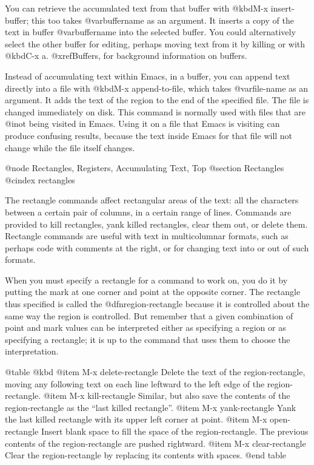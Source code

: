 {{{{{{{{  You can retrieve the accumulated text from that buffer with @kbd{M-x
insert-buffer}; this too takes @var{buffername} as an argument.  It inserts
a copy of the text in buffer @var{buffername} into the selected buffer.
You could alternatively select the other buffer for editing, perhaps moving
text from it by killing or with @kbd{C-x a}.  @xref{Buffers}, for
background information on buffers.

  Instead of accumulating text within Emacs, in a buffer, you can append
text directly into a file with @kbd{M-x append-to-file}, which takes
@var{file-name} as an argument.  It adds the text of the region to the end
of the specified file.  The file is changed immediately on disk. This
command is normally used with files that are @i{not} being visited in
Emacs.  Using it on a file that Emacs is visiting can produce confusing
results, because the text inside Emacs for that file will not change
while the file itself changes.

@node Rectangles, Registers, Accumulating Text, Top
@section Rectangles
@cindex rectangles

  The rectangle commands affect rectangular areas of the text: all the
characters between a certain pair of columns, in a certain range of lines.
Commands are provided to kill rectangles, yank killed rectangles, clear
them out, or delete them.  Rectangle commands are useful with text in
multicolumnar formats, such as perhaps code with comments at the right,
or for changing text into or out of such formats.

  When you must specify a rectangle for a command to work on, you do
it by putting the mark at one corner and point at the opposite corner.
The rectangle thus specified is called the @dfn{region-rectangle}
because it is controlled about the same way the region is controlled.
But remember that a given combination of point and mark values can be
interpreted either as specifying a region or as specifying a
rectangle; it is up to the command that uses them to choose the
interpretation.

@table @kbd
@item M-x delete-rectangle
Delete the text of the region-rectangle, moving any following text on
each line leftward to the left edge of the region-rectangle.
@item M-x kill-rectangle
Similar, but also save the contents of the region-rectangle as the
``last killed rectangle''.
@item M-x yank-rectangle
Yank the last killed rectangle with its upper left corner at point.
@item M-x open-rectangle
Insert blank space to fill the space of the region-rectangle.
The previous contents of the region-rectangle are pushed rightward.
@item M-x clear-rectangle
Clear the region-rectangle by replacing its contents with spaces.
@end table

}}}}}}}}
